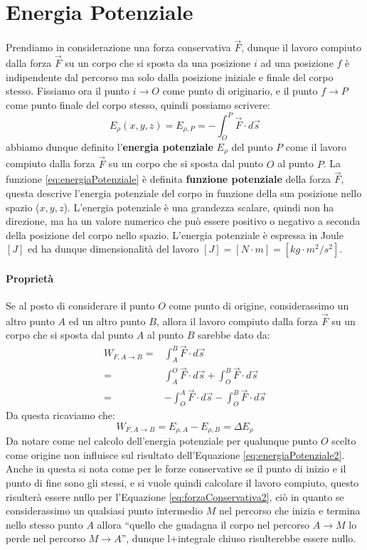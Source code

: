 \section{Energia Potenziale}
    \label{subsec:energiaPotenziale}
    Prendiamo in considerazione una forza conservativa $\vec{F}$, dunque il lavoro compiuto dalla forza $\vec{F}$ su un corpo che si sposta da una posizione $i$ ad una posizione $f$ è indipendente dal percorso ma solo dalla posizione iniziale e finale del corpo stesso. Fissiamo ora il punto $i\rightarrow O$ come punto di originario, e il punto $f\rightarrow P$ come punto finale del corpo stesso, quindi possiamo scrivere:
    \begin{equation}
        E_{\rho}(x,y,z)=E_{\rho,P}=-\int_{O}^{P} \vec{F}\cdot d\vec{s} \label{eq:energiaPotenziale}
    \end{equation}
    abbiamo dunque definito l'\textbf{energia potenziale} $E_{\rho}$ del punto $P$ come il lavoro compiuto dalla forza $\vec{F}$ su un corpo che si sposta dal punto $O$ al punto $P$. La funzione \ref{eq:energiaPotenziale} è definita \textbf{funzione potenziale} della forza $\vec{F}$, questa descrive l'energia potenziale del corpo in funzione della sua posizione nello spazio ($x,y,z$). L'energia potenziale è una grandezza scalare, quindi non ha direzione, ma ha un valore numerico che può essere positivo o negativo a seconda della posizione del corpo nello spazio. L'energia potenziale è espressa in Joule $[J]$ ed ha dunque dimensionalità del lavoro $[J] = [N\cdot m] = [kg\cdot m^2/s^2]$.
    \paragraph{Proprietà} Se al posto di considerare il punto $O$ come punto di origine, considerassimo un altro punto $A$ ed un altro punto $B$, allora il lavoro compiuto dalla forza $\vec{F}$ su un corpo che si sposta dal punto $A$ al punto $B$ sarebbe dato da:
    $$
        \begin{aligned}
            W_{F,A\to B} =& \int_{A}^{B} \vec{F}\cdot d\vec{s}\\
            =& \int_{A}^{O} \vec{F}\cdot d\vec{s} + \int_{O}^{B} \vec{F}\cdot d\vec{s}\\
            =& -\int_{O}^{A} \vec{F}\cdot d\vec{s} - \int_{O}^{B} \vec{F}\cdot d\vec{s}
        \end{aligned}
    $$
    Da questa ricaviamo che:
    \begin{equation}
        W_{F,A\to B}=E_{\rho, A} - E_{\rho,B} = \Delta E_{\rho} \label{eq:energiaPotenziale2}
    \end{equation}
    Da notare come nel calcolo dell'energia potenziale per qualunque punto $O$ scelto come origine non influisce sul risultato dell'Equazione \ref{eq:energiaPotenziale2}. Anche in questa si nota come per le forze conservative se il punto di inizio e il punto di fine sono gli stessi, e si vuole quindi calcolare il lavoro compiuto, questo risulterà essere nullo per l'Equazione \ref{eq:forzaConservativa2}, ciò in quanto se considerassimo un qualsiasi punto intermedio $M$ nel percorso che inizia e termina nello stesso punto $A$ allora ``quello che guadagna il corpo nel percorso $A\to M$ lo perde nel percorso $M\to A$'', dunque l+integrale chiuso risulterebbe essere nullo.
